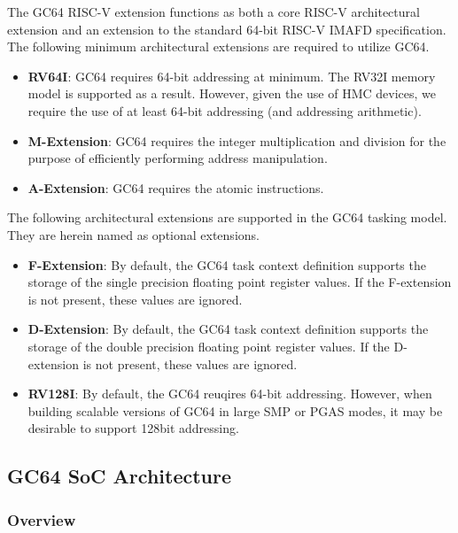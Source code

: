 \documentclass{article}
\begin{document}
The GC64 RISC-V extension functions as both a core RISC-V \cite{Waterman:EECS-2014-54} architectural extension and an extension to the standard 64-bit RISC-V IMAFD specification.  The following minimum architectural extensions are required to utilize GC64.  

\begin{itemize}
\item \textbf{RV64I}:  GC64 requires 64-bit addressing at minimum.  The RV32I memory model is supported as a result.  However, given the use of HMC devices, we require the use of at least 64-bit addressing (and addressing arithmetic).  
\item \textbf{M-Extension}:  GC64 requires the integer multiplication and division for the purpose of efficiently performing address manipulation.  
\item \textbf{A-Extension}: GC64 requires the atomic instructions.
\end{itemize}

The following architectural extensions are supported in the GC64 tasking model.  They are herein named as optional extensions.  

\begin{itemize}
\item \textbf{F-Extension}:  By default, the GC64 task context definition supports the storage of the single precision floating point register values.  If the F-extension is not present, these values are ignored.  
\item \textbf{D-Extension}: By default, the GC64 task context definition supports the storage of the double precision floating point register values.  If the D-extension is not present, these values are ignored.  
\item \textbf{RV128I}: By default, the GC64 reuqires 64-bit addressing.  However, when building scalable versions of GC64 in large SMP or PGAS modes, it may be desirable to support 128bit addressing.  
\end{itemize}

\subsection{GC64 SoC Architecture}

\subsubsection{Overview}
\end{document}
